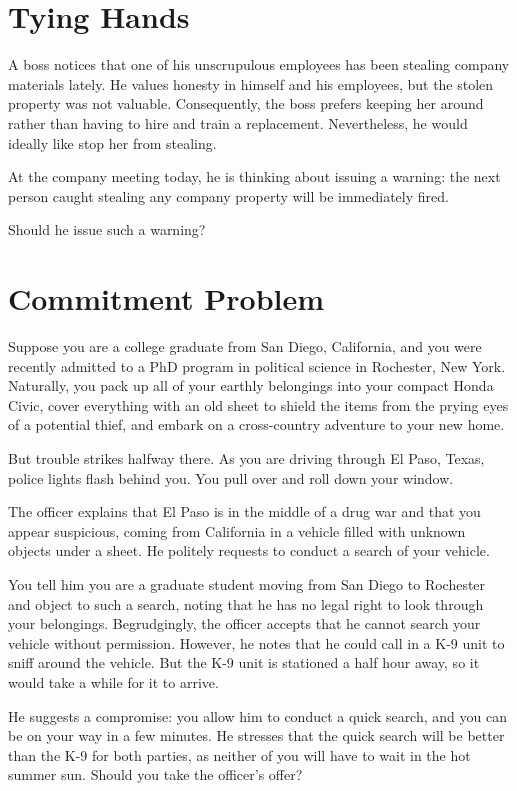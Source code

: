 \documentclass{article}
\begin{document}
\section{Tying Hands}
\label{tyinghands}

A boss notices that one of his unscrupulous employees has been stealing company materials lately. He values honesty in himself and his employees, but the stolen property was not valuable. Consequently, the boss prefers keeping her around rather than having to hire and train a replacement. Nevertheless, he would ideally like stop her from stealing.

At the company meeting today, he is thinking about issuing a warning: the next person caught stealing any company property will be immediately fired.

Should he issue such a warning?

\section{Commitment Problem}
\label{commitmentproblem}

Suppose you are a college graduate from San Diego, California, and you were recently admitted to a PhD program in political science in Rochester, New York. Naturally, you pack up all of your earthly belongings into your compact Honda Civic, cover everything with an old sheet to shield the items from the prying eyes of a potential thief, and embark on a cross-country adventure to your new home.

But trouble strikes halfway there. As you are driving through El Paso, Texas, police lights flash behind you. You pull over and roll down your window.

The officer explains that El Paso is in the middle of a drug war and that you appear suspicious, coming from California in a vehicle filled with unknown objects under a sheet. He politely requests to conduct a search of your vehicle.

You tell him you are a graduate student moving from San Diego to Rochester and object to such a search, noting that he has no legal right to look through your belongings. Begrudgingly, the officer accepts that he cannot search your vehicle without permission. However, he notes that he could call in a K-9 unit to sniff around the vehicle. But the K-9 unit is stationed a half hour away, so it would take a while for it to arrive.

He suggests a compromise: you allow him to conduct a quick search, and you can be on your way in a few minutes. He stresses that the quick search will be better than the K-9 for both parties, as neither of you will have to wait in the hot summer sun. Should you take the officer’s offer?
\end{document}
